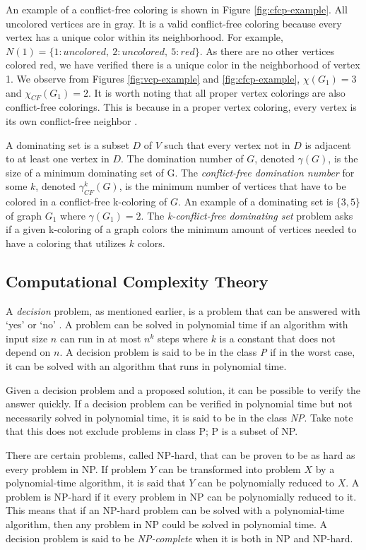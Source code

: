 \documentclass{sig-alternate}
\begin{document}
An example of a conflict-free coloring is shown in Figure \ref{fig:cfcp-example}. All uncolored vertices are in gray. It is a valid conflict-free coloring because every vertex has a unique color within its neighborhood. For example, $N(1) = \{1: uncolored,\ 2: uncolored,\ 5: red\}$. As there are no other vertices colored red, we have verified there is a unique color in the neighborhood of vertex 1. We observe from Figures \ref{fig:vcp-example} and \ref{fig:cfcp-example}, $\chi(G_1) = 3$ and $\chi_{CF}(G_1) = 2$. It is worth noting that all proper vertex colorings are also conflict-free colorings. This is because in a proper vertex coloring, every vertex is its own conflict-free neighbor \cite{abel2017three}.

A dominating set is a subset $D$ of $V$ such that every vertex not in $D$ is adjacent to at least one vertex in $D$. The domination number of $G$, denoted $\gamma(G)$, is the size of a minimum dominating set of G. The \emph{conflict-free domination number} for some $k$, denoted $\gamma_{CF}^k(G)$, is the minimum number of vertices that have to be colored in a conflict-free k-coloring of $G$. An example of a dominating set is $\{3, 5\}$ of graph $G_1$ where $\gamma(G_1) = 2$. The \emph{k-conflict-free dominating set} problem asks if a given k-coloring of a graph colors the minimum amount of vertices needed to have a coloring that utilizes $k$ colors.

\subsection{Computational Complexity Theory}
\label{sec:complexitytheory}
A \emph{decision} problem, as mentioned earlier, is a problem that can be answered with `yes' or `no' \cite{sipser2006introduction}. A problem can be solved in polynomial time if an algorithm with input size $n$ can run in at most $n^k$ steps where $k$ is a constant that does not depend on $n$. A decision problem is said to be in the class \emph{P} if in the worst case, it can be solved with an algorithm that runs in polynomial time.

Given a decision problem and a proposed solution, it can be possible to verify the answer quickly. If a decision problem can be verified in polynomial time but not necessarily solved in polynomial time, it is said to be in the class \emph{NP}. Take note that this does not exclude problems in class P; P is a subset of NP.

There are certain problems, called NP-hard, that can be proven to be as hard as every problem in NP. If problem $Y$ can be transformed into problem $X$ by a polynomial-time algorithm, it is said that $Y$ can be polynomially reduced to $X$. A problem is NP-hard if it every problem in NP can be polynomially reduced to it. This means that if an NP-hard problem can be solved with a polynomial-time algorithm, then any problem in NP could be solved in polynomial time. A decision problem is said to be \emph{NP-complete} when it is both in NP and NP-hard.
\end{document}
